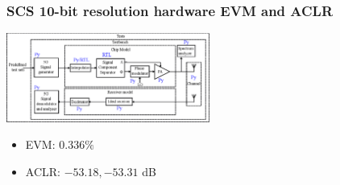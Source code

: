 \documentclass{sdkslides}
\begin{document}
\begin{frame}[t]
    \frametitle{SCS 10-bit resolution hardware EVM and ACLR }
    \begin{center}
        \includegraphics[width=0.5\textwidth]{Pics/outphasing_model_scs.eps}
    \end{center}
    \begin{figure}
        \begin{center}
            \qquad
        \end{center}
    \end{figure}
    \begin{itemize}
        \item EVM: $0.336\%$
        \item ACLR: $-53.18, -53.31$ dB
    \end{itemize}
\end{frame}


\renewcommand{\sectionname}{A-Core RISC-V processor chip}
\end{document}
